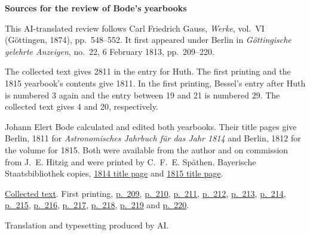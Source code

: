 \clearpage\thispagestyle{empty}
\begin{center}\textbf{Sources for the review of Bode's yearbooks}\end{center}
\noindent This AI-translated review follows Carl Friedrich Gauss, \textit{Werke}, vol.~VI (Göttingen, 1874), pp.~548--552. It first appeared under Berlin in \textit{Göttingische gelehrte Anzeigen}, no.~22, 6 February 1813, pp.~209--220.
\par\smallskip\noindent The collected text gives 2811 in the entry for Huth. The first printing and the 1815 yearbook’s contents give 1811. In the first printing, Bessel’s entry after Huth is numbered 3 again and the entry between 19 and 21 is numbered 29. The collected text gives 4 and 20, respectively.
\par\smallskip\noindent Johann Elert Bode calculated and edited both yearbooks. Their title pages give Berlin, 1811 for \textit{Astronomisches Jahrbuch für das Jahr 1814} and Berlin, 1812 for the volume for 1815. Both were available from the author and on commission from J.~E. Hitzig and were printed by C.~F.~E. Späthen. Bayerische Staatsbibliothek copies, \href{https://api.digitale-sammlungen.de/iiif/image/v2/bsb10538343_00005/full/1400,/0/default.jpg}{1814 title page} and \href{https://api.digitale-sammlungen.de/iiif/image/v2/bsb10538344_00005/full/1400,/0/default.jpg}{1815 title page}.
\par\smallskip\noindent \href{https://gdz.sub.uni-goettingen.de/id/PPN236007467}{Collected text}. First printing, \href{https://images.p.sub.uni-goettingen.de/iiif/image/gdz:PPN319721507_1813:00000211/full/1650,/0/default.jpg}{p.~209}, \href{https://images.p.sub.uni-goettingen.de/iiif/image/gdz:PPN319721507_1813:00000212/full/1650,/0/default.jpg}{p.~210}, \href{https://images.p.sub.uni-goettingen.de/iiif/image/gdz:PPN319721507_1813:00000213/full/1650,/0/default.jpg}{p.~211}, \href{https://images.p.sub.uni-goettingen.de/iiif/image/gdz:PPN319721507_1813:00000214/full/1650,/0/default.jpg}{p.~212}, \href{https://images.p.sub.uni-goettingen.de/iiif/image/gdz:PPN319721507_1813:00000215/full/1650,/0/default.jpg}{p.~213}, \href{https://images.p.sub.uni-goettingen.de/iiif/image/gdz:PPN319721507_1813:00000216/full/1650,/0/default.jpg}{p.~214}, \href{https://images.p.sub.uni-goettingen.de/iiif/image/gdz:PPN319721507_1813:00000217/full/1650,/0/default.jpg}{p.~215}, \href{https://images.p.sub.uni-goettingen.de/iiif/image/gdz:PPN319721507_1813:00000218/full/1650,/0/default.jpg}{p.~216}, \href{https://images.p.sub.uni-goettingen.de/iiif/image/gdz:PPN319721507_1813:00000219/full/1650,/0/default.jpg}{p.~217}, \href{https://images.p.sub.uni-goettingen.de/iiif/image/gdz:PPN319721507_1813:00000220/full/1650,/0/default.jpg}{p.~218}, \href{https://images.p.sub.uni-goettingen.de/iiif/image/gdz:PPN319721507_1813:00000221/full/1650,/0/default.jpg}{p.~219} and \href{https://images.p.sub.uni-goettingen.de/iiif/image/gdz:PPN319721507_1813:00000222/full/1650,/0/default.jpg}{p.~220}.
\par\smallskip\noindent Translation and typesetting produced by AI.
\clearpage
